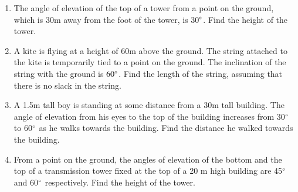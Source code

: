 \begin{enumerate}[label=\thesection.\arabic*.,ref=\thesection.\theenumi]
%
\item The angle of elevation of the top of a tower from a point on the ground, which is 30m away from the foot of the tower, is 30$\degree$.  Find the height of the tower.
%
\item A kite is flying at a height of 60m above the ground.  The string attached to the kite is temporarily tied to a point on the ground.  The inclination of the string with the ground is $60\degree$.  Find the length of the string, assuming that there is no slack in the string.
%
\item A 1.5m tall boy is standing at some distance from a 30m tall building.  The angle of elevation from his eyes to the top of the building increases from 30$\degree$
 to 60$\degree $ as he walks towards the building.  Find the distance he walked towards the building.

\item From a point on the ground, the angles of elevation of the bottom and the top of a transmission tower fixed at the top of a 20 m high building are 45$\degree$ and 60$\degree$ respectively. Find the height of the tower.


\end{enumerate}
